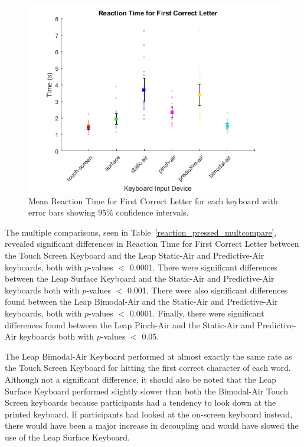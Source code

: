 \begin{figure}[h]
	\centering
	\includegraphics{fig_reaction_pressed_mean}
	\caption[Mean Reaction Time for First Correct Letter]{Mean Reaction Time for First Correct Letter for each keyboard with error bars showing 95\% confidence intervals.}
	\label{fig_reaction_pressed_mean}
\end{figure}

The multiple comparisons, seen in Table~\ref{reaction_pressed_multcompare}, revealed significant differences in Reaction Time for First Correct Letter between the Touch Screen Keyboard and the Leap Static-Air and Predictive-Air keyboards, both with $p$-values $<$ 0.0001. There were significant differences between the Leap Surface Keyboard and the Static-Air and Predictive-Air keyboards both with $p$-values $<$ 0.001. There were also significant differences found between the Leap Bimodal-Air and the Static-Air and Predictive-Air keyboards, both with $p$-values $<$ 0.0001. Finally, there were significant differences found between the Leap Pinch-Air and the Static-Air and Predictive-Air keyboards both with $p$-values $<$ 0.05.

The Leap Bimodal-Air Keyboard performed at almost exactly the same rate as the Touch Screen Keyboard for hitting the first correct character of each word. Although not a significant difference, it should also be noted that the Leap Surface Keyboard performed slightly slower than both the Bimodal-Air Touch Screen keyboards because participants had a tendency to look down at the printed keyboard. If participants had looked at the on-screen keyboard instead, there would have been a major increase in decoupling and would have slowed the use of the Leap Surface Keyboard.

